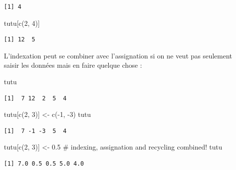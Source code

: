 \documentclass[
  letterpaper,
  DIV=11,
  numbers=noendperiod]{scrreprt}
\newenvironment{Shaded}{\begin{snugshade}}{\end{snugshade}}
\newcommand{\CommentTok}[1]{\textcolor[rgb]{0.37,0.37,0.37}{#1}}
\newcommand{\DecValTok}[1]{\textcolor[rgb]{0.68,0.00,0.00}{#1}}
\newcommand{\FloatTok}[1]{\textcolor[rgb]{0.68,0.00,0.00}{#1}}
\newcommand{\FunctionTok}[1]{\textcolor[rgb]{0.28,0.35,0.67}{#1}}
\newcommand{\NormalTok}[1]{\textcolor[rgb]{0.00,0.23,0.31}{#1}}
\newcommand{\OtherTok}[1]{\textcolor[rgb]{0.00,0.23,0.31}{#1}}
\newcommand{\SpecialCharTok}[1]{\textcolor[rgb]{0.37,0.37,0.37}{#1}}
\begin{document}
\begin{verbatim}
[1] 4
\end{verbatim}

\begin{Shaded}
\begin{Highlighting}[]
\NormalTok{tutu[}\FunctionTok{c}\NormalTok{(}\DecValTok{2}\NormalTok{, }\DecValTok{4}\NormalTok{)]}
\end{Highlighting}
\end{Shaded}

\begin{verbatim}
[1] 12  5
\end{verbatim}

L'indexation peut se combiner avec l'assignation si on ne veut pas
seulement saisir les données mais en faire quelque chose :

\begin{Shaded}
\begin{Highlighting}[]
\NormalTok{tutu}
\end{Highlighting}
\end{Shaded}

\begin{verbatim}
[1]  7 12  2  5  4
\end{verbatim}

\begin{Shaded}
\begin{Highlighting}[]
\NormalTok{tutu[}\FunctionTok{c}\NormalTok{(}\DecValTok{2}\NormalTok{, }\DecValTok{3}\NormalTok{)] }\OtherTok{\textless{}{-}} \FunctionTok{c}\NormalTok{(}\SpecialCharTok{{-}}\DecValTok{1}\NormalTok{, }\SpecialCharTok{{-}}\DecValTok{3}\NormalTok{)}
\NormalTok{tutu}
\end{Highlighting}
\end{Shaded}

\begin{verbatim}
[1]  7 -1 -3  5  4
\end{verbatim}

\begin{Shaded}
\begin{Highlighting}[]
\NormalTok{tutu[}\FunctionTok{c}\NormalTok{(}\DecValTok{2}\NormalTok{, }\DecValTok{3}\NormalTok{)] }\OtherTok{\textless{}{-}} \FloatTok{0.5}  \CommentTok{\# indexing, assignation and recycling combined!}
\NormalTok{tutu}
\end{Highlighting}
\end{Shaded}

\begin{verbatim}
[1] 7.0 0.5 0.5 5.0 4.0
\end{verbatim}
\end{document}
